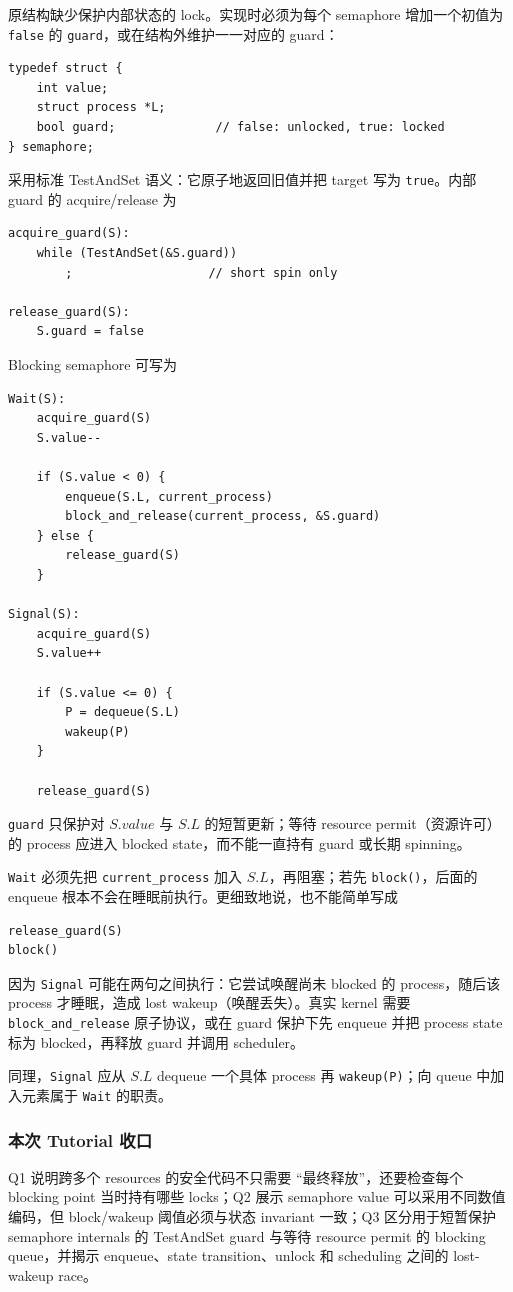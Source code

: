 \begin{checkedsolution}
原结构缺少保护内部状态的 lock。实现时必须为每个 semaphore 增加一个初值为 \texttt{false} 的 \texttt{guard}，或在结构外维护一一对应的 guard：
\begin{verbatim}
typedef struct {
    int value;
    struct process *L;
    bool guard;              // false: unlocked, true: locked
} semaphore;
\end{verbatim}
采用标准 TestAndSet 语义：它原子地返回旧值并把 target 写为 \texttt{true}。内部 guard 的 acquire/release 为
\begin{verbatim}
acquire_guard(S):
    while (TestAndSet(&S.guard))
        ;                   // short spin only

release_guard(S):
    S.guard = false
\end{verbatim}

Blocking semaphore 可写为
\begin{verbatim}
Wait(S):
    acquire_guard(S)
    S.value--

    if (S.value < 0) {
        enqueue(S.L, current_process)
        block_and_release(current_process, &S.guard)
    } else {
        release_guard(S)
    }

Signal(S):
    acquire_guard(S)
    S.value++

    if (S.value <= 0) {
        P = dequeue(S.L)
        wakeup(P)
    }

    release_guard(S)
\end{verbatim}

\texttt{guard} 只保护对 $S.value$ 与 $S.L$ 的短暂更新；等待 resource permit（资源许可）的 process 应进入 blocked state，而不能一直持有 guard 或长期 spinning。

\texttt{Wait} 必须先把 \texttt{current\_process} 加入 $S.L$，再阻塞；若先 \texttt{block()}，后面的 enqueue 根本不会在睡眠前执行。更细致地说，也不能简单写成
\begin{verbatim}
release_guard(S)
block()
\end{verbatim}
因为 \texttt{Signal} 可能在两句之间执行：它尝试唤醒尚未 blocked 的 process，随后该 process 才睡眠，造成 lost wakeup（唤醒丢失）。真实 kernel 需要 \texttt{block\_and\_release} 原子协议，或在 guard 保护下先 enqueue 并把 process state 标为 blocked，再释放 guard 并调用 scheduler。

同理，\texttt{Signal} 应从 $S.L$ dequeue 一个具体 process 再 \texttt{wakeup(P)}；向 queue 中加入元素属于 \texttt{Wait} 的职责。
\end{checkedsolution}

\subsubsection*{本次 Tutorial 收口}

Q1 说明跨多个 resources 的安全代码不只需要 ``最终释放''，还要检查每个 blocking point 当时持有哪些 locks；Q2 展示 semaphore value 可以采用不同数值编码，但 block/wakeup 阈值必须与状态 invariant 一致；Q3 区分用于短暂保护 semaphore internals 的 TestAndSet guard 与等待 resource permit 的 blocking queue，并揭示 enqueue、state transition、unlock 和 scheduling 之间的 lost-wakeup race。
